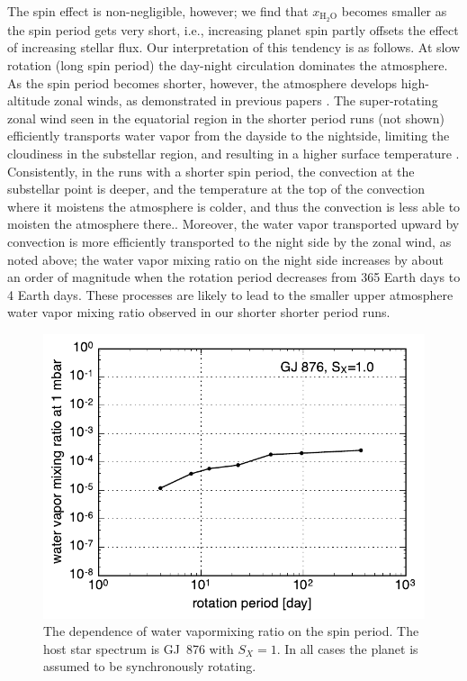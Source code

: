 \documentclass[11pt,numberedappendix,twocolappendix,]{emulateapj}
\def\water{H$_2$O}
\def\xwater{$x_\text{\water}$}
\def\wv{water vapor}
\newcommand{\yf}[1]{{\color{orange}#1}}
\begin{document}
\yf{The spin effect is non-negligible, however;} we find that \xwater{} becomes smaller as the spin period gets very short\yf{, i.e., increasing planet spin partly offsets the effect of increasing stellar flux.}  %
Our interpretation of this tendency is as follows. 
\yf{At} slow rotation (long spin period) the day-night circulation dominates the atmosphere. 
As the spin period becomes shorter, however, the atmosphere develops high-altitude zonal winds, as demonstrated in previous papers \citep{Merlis2010, Edson2011, Kopparapu2016}. 
%
The super-rotating zonal wind seen in the equatorial region in the shorter period runs (not shown) efficiently \yf{transports water vapor from the dayside to the nightside, limiting the cloudiness in the substellar region}, and 
resulting in a higher surface temperature \citep{Kopparapu2016}.  
Consistently, in the runs with a shorter spin period, \yf{the convection at the substellar point is deeper, and the temperature at the top of the convection  where it moistens the atmosphere is colder, and thus the convection is less able to moisten the atmosphere there.}. 
Moreover, the \wv{} transported upward by convection is \yf{more} efficiently transported to the night side by the zonal wind, \yf{as noted above}; the water vapor mixing ratio \yf{on} the night side increases by about an order of magnitude when the rotation period decreases from 365 Earth days to 4 Earth days. 
These processes are likely to lead to the smaller upper atmosphere \wv{} mixing ratio observed in our shorter shorter period runs. 


\begin{figure}[!h]
    \begin{center}
    \includegraphics[width=\hsize]{xH2O_Prot.pdf}
    \end{center}
\caption{The dependence of \wv mixing ratio on the spin period. The host star spectrum is GJ~876 with $S_X=1$. In all cases the planet is assumed to be synchronously rotating. }
\label{fig:changeP}
\end{figure}
\end{document}
